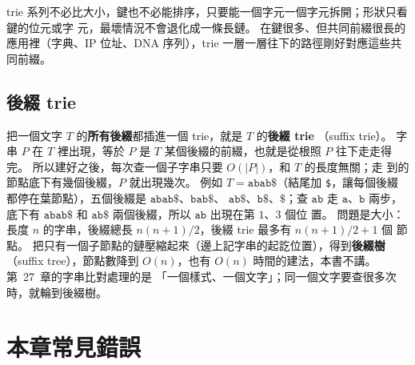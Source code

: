 trie 系列不必比大小，鍵也不必能排序，只要能一個字元一個字元拆開；形狀只看鍵的位元或字
元，最壞情況不會退化成一條長鏈。 在鍵很多、但共同前綴很長的應用裡（字典、IP 位址、DNA
序列），trie 一層一層往下的路徑剛好對應這些共同前綴。

\subsection{後綴 trie}
\label{sec:mw-suffix}

把一個文字 $T$ 的\textbf{所有後綴}都插進一個 trie，就是 $T$ 的\textbf{後綴 trie}
（suffix trie）。 字串 $P$ 在 $T$ 裡出現，等於 $P$ 是 $T$ 某個後綴的前綴，也就是從根照
$P$ 往下走走得完。 所以建好之後，每次查一個子字串只要 $O(|P|)$，和 $T$ 的長度無關；走
到的節點底下有幾個後綴，$P$ 就出現幾次。 例如 $T = \mathtt{abab\$}$（結尾加
\texttt{\$}，讓每個後綴都停在葉節點），五個後綴是 $\mathtt{abab\$}$、$\mathtt{bab\$}$、
$\mathtt{ab\$}$、$\mathtt{b\$}$、$\mathtt{\$}$；查 $\mathtt{ab}$ 走 $\mathtt{a}$、$\mathtt{b}$ 兩步，
底下有 $\mathtt{abab\$}$ 和 $\mathtt{ab\$}$ 兩個後綴，所以 $\mathtt{ab}$ 出現在第 $1$、$3$ 個位
置。 問題是大小：長度 $n$ 的字串，後綴總長 $n(n+1)/2$，後綴 trie 最多有 $n(n+1)/2 + 1$ 個
節點。 把只有一個子節點的鏈壓縮起來（邊上記字串的起訖位置），得到\textbf{後綴樹}（suffix
tree），節點數降到 $O(n)$，也有 $O(n)$ 時間的建法，本書不講。 第~27~章的字串比對處理的是
「一個樣式、一個文字」；同一個文字要查很多次時，就輪到後綴樹。

\section{本章常見錯誤}
\label{sec:mw-pitfalls}

